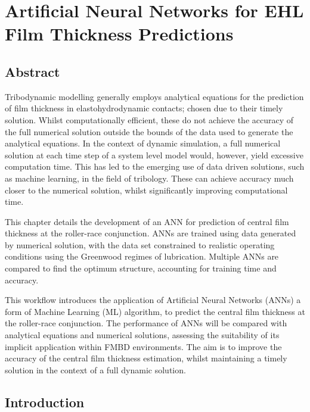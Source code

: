 \chapter{Artificial Neural Networks for EHL Film Thickness Predictions}
\label{ANN Lubricated Bearing FMBD}

\section{Abstract}

Tribodynamic modelling generally employs analytical equations for the prediction of film thickness in elastohydrodynamic contacts; chosen due to their timely solution. Whilst computationally efficient, these do not achieve the accuracy of the full numerical solution outside the bounds of the data used to generate the analytical equations. In the context of dynamic simulation, a full numerical solution at each time step of a system level model would, however, yield excessive computation time. This has led to the emerging use of data driven solutions, such as machine learning, in the field of tribology. These can achieve accuracy much closer to the numerical solution, whilst significantly improving computational time.

This chapter details the development of an ANN for prediction of central film thickness at the roller-race conjunction. ANNs are trained using data generated by numerical solution, with the data set constrained to realistic operating conditions using the Greenwood regimes of lubrication. Multiple ANNs are compared to find the optimum structure, accounting for training time and accuracy.

This workflow introduces the application of Artificial Neural Networks (ANNs) a form of Machine Learning (ML) algorithm, to predict the central film thickness at the roller-race conjunction. The performance of ANNs will be compared with analytical equations and numerical solutions, assessing the suitability of its implicit application within FMBD environments. The aim is to improve the accuracy of the central film thickness estimation, whilst maintaining a timely solution in the context of a full dynamic solution.



\section{Introduction}


